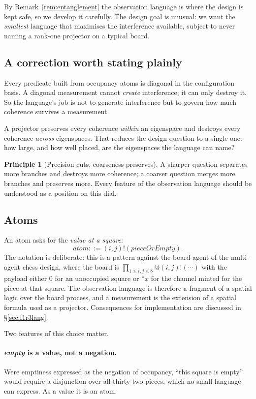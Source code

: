 \documentclass[11pt,a4paper]{article}
\theoremstyle{definition}
\newtheorem{principle}[definition]{Principle}
\theoremstyle{plain}
\begin{document}
By Remark~\ref{rem:entanglement} the observation language is where the design
is kept safe, so we develop it carefully. The design goal is unusual: we want
the \emph{smallest} language that maximises the interference available, subject
to never naming a rank-one projector on a typical board.

\subsection{A correction worth stating plainly}

Every predicate built from occupancy atoms is diagonal in the configuration
basis. A diagonal measurement cannot \emph{create} interference; it can only
destroy it. So the language's job is not to generate interference but to govern
how much coherence survives a measurement.

A projector preserves every coherence \emph{within} an eigenspace and destroys
every coherence \emph{across} eigenspaces. That reduces the design question to
a single one: how large, and how well placed, are the eigenspaces the language
can name?

\begin{principle}[Precision cuts, coarseness preserves]
\label{prin:dial}
A sharper question separates more branches and destroys more coherence; a
coarser question merges more branches and preserves more. Every feature of the
observation language should be understood as a position on this dial.
\end{principle}

\subsection{Atoms}

An atom asks for the \emph{value at a square}:
\[
  \textit{atom} ::= (i,j)!(\textit{pieceOrEmpty}).
\]
The notation is deliberate: this is a pattern against the board agent of the
multi-agent chess design, where the board is
$\prod_{1\le i,j\le 8} @(i,j)!(\cdots)$ with the payload either $0$ for an
unoccupied square or $*x$ for the channel minted for the piece at that square.
The observation language is therefore a fragment of a spatial logic over the
board process, and a measurement is the extension of a spatial formula used as
a projector. Consequences for implementation are discussed in
\S\ref{sec:f1r3lang}.

Two features of this choice matter.

\paragraph{\textit{empty} is a value, not a negation.}
Were emptiness expressed as the negation of occupancy, ``this square is empty''
would require a disjunction over all thirty-two pieces, which no small language
can express. As a value it is an atom.
\end{document}

